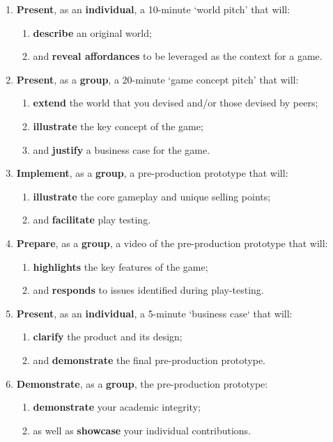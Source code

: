 \documentclass{../../fal_assignment}
\begin{document}
\begin{enumerate}[label=(\Alph*)]
    \item \textbf{Present}, as an \textbf{individual}, a 10-minute `world pitch' that will:
    	\begin{enumerate}[label=\roman*.]
    		\item \textbf{describe} an original world;
    		\item and \textbf{reveal affordances} to be leveraged as the context for a game.
	\end{enumerate}
    \item \textbf{Present}, as a \textbf{group}, a 20-minute `game concept pitch' that will:
    	\begin{enumerate}[label=\roman*.]
    		\item \textbf{extend} the world that you devised and/or those devised by peers;
    		\item \textbf{illustrate} the key concept of the game;
    		\item and \textbf{justify} a business case for the game.
	\end{enumerate}
    \item \textbf{Implement}, as a \textbf{group}, a pre-production prototype that will:
    	\begin{enumerate}[label=\roman*.]
    		\item \textbf{illustrate} the core gameplay and unique selling points;
    		\item and \textbf{facilitate} play testing.
	\end{enumerate}
    \item \textbf{Prepare}, as a \textbf{group}, a video of the pre-production prototype that will:
    	\begin{enumerate}[label=\roman*.]
    		\item \textbf{highlights} the key features of the game;
    		\item and \textbf{responds} to issues identified during play-testing.
	\end{enumerate}
    \item \textbf{Present}, as an \textbf{individual}, a 5-minute `business case` that will:
    	\begin{enumerate}[label=\roman*.]
    		\item \textbf{clarify} the product and its design;
    		\item and \textbf{demonstrate} the final pre-production prototype.
	\end{enumerate}
    \item \textbf{Demonstrate}, as a \textbf{group}, the pre-production prototype:
    	\begin{enumerate}[label=\roman*.]
    		\item \textbf{demonstrate} your academic integrity;
    		\item as well as \textbf{showcase} your individual contributions.
	\end{enumerate}
\end{enumerate}
\end{document}
